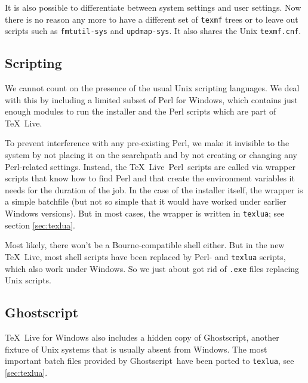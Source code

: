 \documentclass{ltugproc}
\newcommand{\tl}{\TeX~Live}
\newcommand{\pl}{Perl}
\newcommand{\gs}{Ghostscript}
\newcommand{\tlu}{\texttt{texlua}}
\begin{document}
It is also possible to differentiate between system settings and
user settings. Now there is no reason any more to have a different
set of \texttt{texmf} trees or to leave out scripts such as
\texttt{fmtutil-sys} and \texttt{updmap-sys}. It also shares the
Unix \texttt{texmf.cnf}.

\subsection{Scripting}
We cannot count on the presence of the usual Unix scripting
languages. We deal with this by including a limited subset of \pl{}
for Windows, which contains just enough modules to run the installer
and the \pl{} scripts which are part of \tl.

To prevent interference with any pre-existing \pl, we make it
invisible to the system by not placing it on the searchpath and by
not creating or changing any \pl-related settings. Instead, the
\tl\ \pl\ scripts are called via wrapper scripts that know how to
find Perl and that create the environment variables it needs for the
duration of the job. In the case of the installer itself, the
wrapper is a simple batchfile (but not so simple that it would have
worked under earlier Windows versions). But in most cases, the
wrapper is written in \tlu; see section \ref{sec:texlua}.

Most likely, there won't be a Bourne-compatible shell either. But in
the new \tl, most shell scripts have been replaced by \pl- and
\tlu{} scripts, which also work under Windows. So we just about got
rid of \texttt{.exe} files replacing Unix scripts.

\subsection{\gs}

\tl{} for Windows also includes a hidden copy of \gs, another
fixture of Unix systems that is usually absent from Windows.  The
most important batch files provided by \gs\ have been ported to
\tlu{}, see \ref{sec:texlua}.
\end{document}
